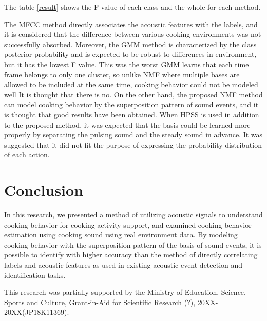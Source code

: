 \documentclass[sigchi]{acmart}
\begin{document}
The table \ref{result} shows the F value of each class and the whole for each method.

The MFCC method directly associates the acoustic features with the labels, and it is considered that the difference between various cooking environments was not successfully absorbed.
Moreover, the GMM method is characterized by the class posterior probability and is expected to be robust to differences in environment, but it has the lowest F value. This was the worst%
GMM learns that each time frame belongs to only one cluster, so unlike NMF where multiple bases are allowed to be included at the same time, cooking behavior could not be modeled well It is thought that there is no.
On the other hand, the proposed NMF method can model cooking behavior by the superposition pattern of sound events, and it is thought that good results have been obtained.
When HPSS is used in addition to the proposed method, it was expected that the basis could be learned more properly by separating the pulsing sound and the steady sound in advance. It was suggested that it did not fit the purpose of expressing the probability distribution of each action.


\section{Conclusion}
In this research, we presented a method of utilizing acoustic signals to understand cooking behavior for cooking activity support, and examined cooking behavior estimation using cooking sound using real environment data.
By modeling cooking behavior with the superposition pattern of the basis of sound events, it is possible to identify with higher accuracy than the method of directly correlating labels and acoustic features as used in existing acoustic event detection and identification tasks.

\begin{acks}
This research was partially supported by the Ministry of Education, Science, Sports and Culture, Grant-in-Aid for Scientific Research (?), 20XX-20XX(JP18K11369).
\end{acks}

%



%
\end{document}
